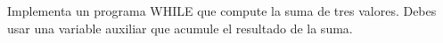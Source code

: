 Implementa un programa WHILE que compute la suma de tres valores.
Debes usar una variable auxiliar que acumule el resultado de la suma.


